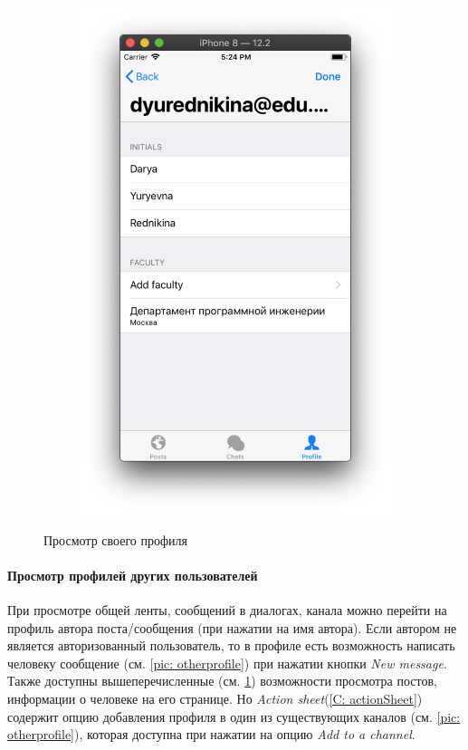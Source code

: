 \documentclass[a4paper,12pt]{article}
\begin{document}
\begin{figure}[h!]
\begin{subfigure}[b]{0.3\linewidth}
			\includegraphics[width=\linewidth]{../includes/pmi/edit_profile.png}
		\end{subfigure}

		\caption{\label{pic: myprofile} Просмотр своего профиля}
	\end{figure}
	\clearpage
	\paragraph{Просмотр профилей других пользователей\\}
	При просмотре общей ленты, сообщений в диалогах, канала можно перейти на профиль автора поста/сообщения (при нажатии на имя автора). Если автором не является авторизованный пользователь, то в профиле есть возможность написать человеку сообщение (см. \ref{pic: otherprofile}) при нажатии кнопки \textit{New message}. Также доступны вышеперечисленные (см. \ref{pic: myprofile}) возможности просмотра постов, информации о человеке на его странице. Но \textit{Action sheet}(\ref{C: actionSheet}) содержит опцию добавления профиля в один из существующих каналов (см. \ref{pic: otherprofile}), которая доступна при нажатии на опцию \textit{Add to a channel}.
	
\end{document}

